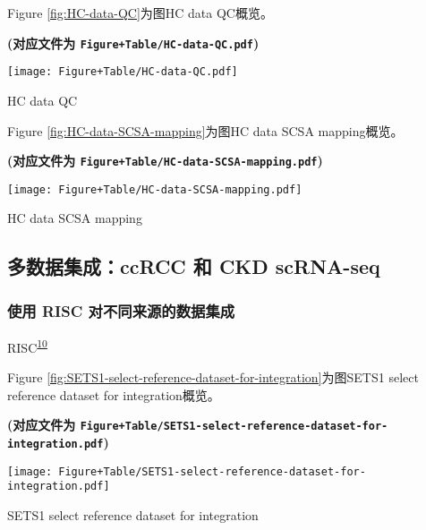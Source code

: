 \documentclass[
]{article}
\begin{document}
Figure \ref{fig:HC-data-QC}为图HC data QC概览。

\textbf{(对应文件为 \texttt{Figure+Table/HC-data-QC.pdf})}

\def\@captype{figure}
\begin{center}
\texttt{[image: Figure+Table/HC-data-QC.pdf]}
\caption{HC data QC}\label{fig:HC-data-QC}
\end{center}

Figure \ref{fig:HC-data-SCSA-mapping}为图HC data SCSA mapping概览。

\textbf{(对应文件为 \texttt{Figure+Table/HC-data-SCSA-mapping.pdf})}

\def\@captype{figure}
\begin{center}
\texttt{[image: Figure+Table/HC-data-SCSA-mapping.pdf]}
\caption{HC data SCSA mapping}\label{fig:HC-data-SCSA-mapping}
\end{center}

\hypertarget{ux591aux6570ux636eux96c6ux6210ccrcc-ux548c-ckd-scrna-seq}{%
\subsection{多数据集成：ccRCC 和 CKD scRNA-seq}\label{ux591aux6570ux636eux96c6ux6210ccrcc-ux548c-ckd-scrna-seq}}

\hypertarget{ux4f7fux7528-risc-ux5bf9ux4e0dux540cux6765ux6e90ux7684ux6570ux636eux96c6ux6210}{%
\subsubsection{使用 RISC 对不同来源的数据集成}\label{ux4f7fux7528-risc-ux5bf9ux4e0dux540cux6765ux6e90ux7684ux6570ux636eux96c6ux6210}}

RISC\textsuperscript{\protect\hyperlink{ref-RobustIntegratLiuY2021}{10}}

Figure \ref{fig:SETS1-select-reference-dataset-for-integration}为图SETS1 select reference dataset for integration概览。

\textbf{(对应文件为 \texttt{Figure+Table/SETS1-select-reference-dataset-for-integration.pdf})}

\def\@captype{figure}
\begin{center}
\texttt{[image: Figure+Table/SETS1-select-reference-dataset-for-integration.pdf]}
\caption{SETS1 select reference dataset for integration}\label{fig:SETS1-select-reference-dataset-for-integration}
\end{center}
\end{document}
